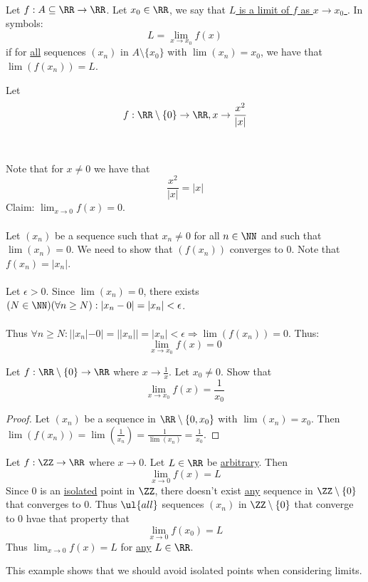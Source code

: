 \documentclass[class=scrartcl, crop=false]{standalone}
\begin{document}
\begin{definition} \leavevmode \\
  Let $f: A \subseteq \RR \to \RR$. Let $x_0 \in \RR$, we say that \ul{$L$ is a limit of $f$ as $x \to x_0$ }. In symbols:
  \[
    L = \lim_{x \to x_0}f(x)
  \]
  if for \ul{all} sequences $(x_n)$ in $A \setminus \{x_0\}$ with $\lim(x_n) = x_0$, we have that $\lim(f(x_n)) = L$.
\end{definition} 

\begin{example}
  Let \[f: \RR \setminus \{0\} \to \RR, x \to \frac{x^2}{|x|}\]
  \\\\
  Note that for $x \neq 0$ we have that 
  \[
    \frac{x ^2}{|x|} = |x|
  \]
  Claim: $\lim_{x \to 0}f(x) = 0$.
  \\\\
  Let $(x_n)$ be a sequence such that $x_n \neq 0$ for all $n \in \NN$ and such that $\lim(x_n) = 0$. We need to show that $(f(x_n))$ converges to $0$. Note that $f(x_n) = |x_n|$.
  \\\\
  Let $\epsilon > 0$. Since $\lim(x_n) = 0$, there exists $(N \in \NN)(\forall n \geq N):|x_n - 0| = |x_n| < \epsilon$.
  \\\\
  Thus $\forall n \geq N : ||x_n| - 0| = ||x_n|| = |x_n| < \epsilon \Rightarrow \lim(f(x_n)) = 0$. Thus:
  \[
    \lim_{x \to x_0}f(x) = 0
  \]
\end{example} 

\begin{example}
  Let $f: \RR \setminus \{0\} \to \RR$ where $x \to \frac{1}{x}$. Let $x_0 \neq 0$. Show that
  \[
    \lim_{x \to x_0}f(x) = \frac{1}{x_0}
  \]
  \begin{proof}
    Let $(x_n)$ be a sequence in $\RR \setminus \{0, x_0\}$ with $\lim(x_n) = x_0$. Then $\lim(f(x_n)) = \lim(\frac{1}{x_n}) = \frac{1}{\lim(x_n)} = \frac{1}{x_0}$.
  \end{proof} 
\end{example} 
\begin{example}
  Let $f: \ZZ \to \RR$ where $x \to 0$. Let $L \in \RR$ be \ul{arbitrary}. Then
  \[
    \lim_{x \to 0}f(x) = L
  \]
  Since $0$ is an \ul{isolated} point in $\ZZ$, there doesn't exist \ul{any} sequence in $\ZZ \setminus \{0\}$ that converges to 0. Thus $\ul{all}$ sequences $(x_n)$ in $\ZZ \setminus \{0\}$ that converge to $0$ hvae that property that
  \[
    \lim_{x \to 0}f(x_0) = L
  \]
  Thus $\lim_{x \to 0} f(x) = L$ for \ul{any} $L \in \RR$.
  \begin{remark}
    This example shows that we should avoid isolated points when considering limits.
  \end{remark} 
\end{example} 
\end{document}

